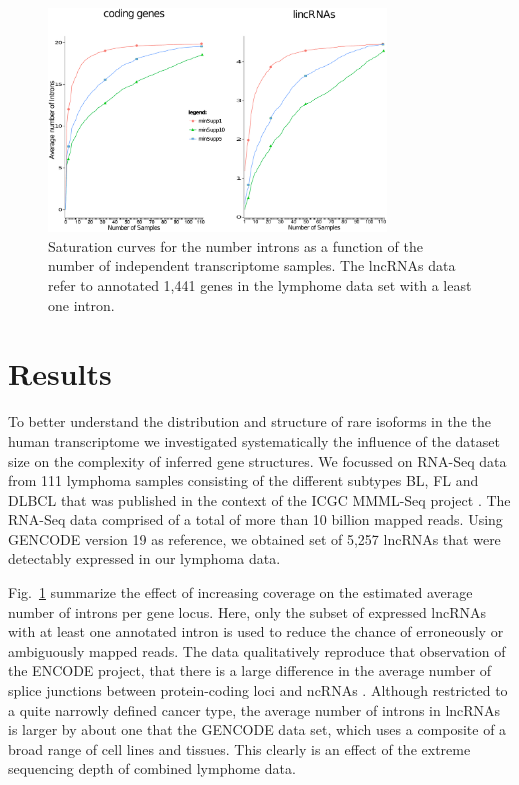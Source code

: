 \documentclass[ncrna,article,submit,moreauthors,pdftex,10pt,a4paper]{mdpi}
\begin{document}
\begin{figure}[t]
\begin{center}
  \includegraphics[width=0.8\textwidth]{saturation}
\end{center}
\caption{Saturation curves for the number introns as a function of the 
  number of independent transcriptome samples. The lncRNAs data refer to 
  annotated 1,441 genes in the lymphome data set with a least one intron. 
  }
  \label{fig:saturation} 
\end{figure}

\section{Results}

To better understand the distribution and structure of rare isoforms in the
the human transcriptome we investigated systematically the influence of the
dataset size on the complexity of inferred gene structures. We focussed on
RNA-Seq data from 111 lymphoma samples consisting of the different subtypes
BL, FL and DLBCL that was published in the context of the ICGC MMML-Seq
project \cite{Richter:12a}. The RNA-Seq data comprised of a total of more
than 10 billion mapped reads. Using GENCODE version 19 as reference, we
obtained set of 5,257 lncRNAs that were detectably expressed in our
lymphoma data.

Fig.~\ref{fig:saturation} summarize the effect of increasing coverage on
the estimated average number of introns per gene locus. Here, only the
subset of expressed lncRNAs with at least one annotated intron is used to
reduce the chance of erroneously or ambiguously mapped reads. The data
qualitatively reproduce that observation of the ENCODE project, that there
is a large difference in the average number of splice junctions between
protein-coding loci and ncRNAs \cite{Derrien:12}. Although restricted to a
quite narrowly defined cancer type, the average number of introns in
lncRNAs is larger by about one that the GENCODE data set, which uses a
composite of a broad range of cell lines and tissues. This clearly is an
effect of the extreme sequencing depth of combined lymphome data. 
\end{document}
